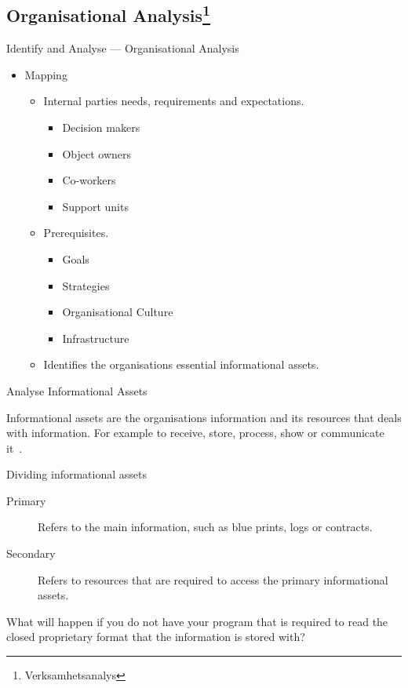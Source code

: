 \documentclass{beamer}
\begin{document}
\subsection{Organisational Analysis\footnote{Verksamhetsanalys}}
\begin{frame}{Identify and Analyse --- Organisational Analysis}
  \begin{itemize}
    \item Mapping
    \begin{itemize}
      \item Internal parties needs, requirements and expectations.
      \begin{itemize}
        \item Decision makers
        \item Object owners
        \item Co-workers
        \item Support units
      \end{itemize}
      \item Prerequisites.
      \begin{itemize}
        \item Goals
        \item Strategies
        \item Organisational Culture
        \item Infrastructure
      \end{itemize}
      \item Identifies the organisations essential informational assets.
    \end{itemize}
  \end{itemize}
\end{frame}

\begin{frame}{Analyse Informational Assets}
  \begin{block}
    Informational assets are the organisations information and its resources
    that deals with information. For example to receive, store, process, show or
    communicate it~\cite{msb_metodstod}.
  \end{block}
\end{frame}

\begin{frame}{Dividing informational assets}
  \begin{description}
    \item[Primary] Refers to the main information, such as blue prints, logs or
      contracts.
    \item[Secondary] Refers to resources that are required to access the primary
      informational assets.
  \end{description}
  What will happen if you do not have your program that is required to read the
  closed proprietary format that the information is stored with?
\end{frame}
\end{document}
